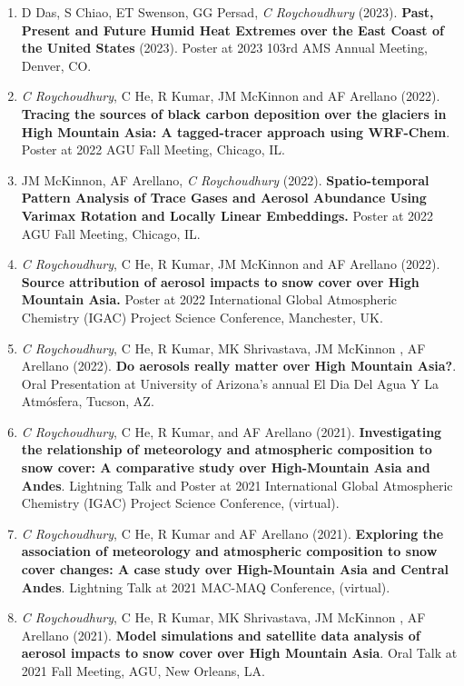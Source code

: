 \documentclass[margin,line]{resume}
\begin{document}
\begin{resume}
\begin{enumerate}[topsep=1pt, partopsep=1pt, itemsep=0.5pt, parsep=0.1pt, leftmargin=15pt,label=\arabic*.]
			\item D Das, S Chiao, ET Swenson, GG Persad, \textit{C Roychoudhury} (2023). \textbf{Past, Present and Future Humid Heat Extremes over the East Coast of the United States} (2023). Poster at 2023 103rd AMS Annual Meeting, Denver, CO. 
			
			\item \textit{C Roychoudhury}, C He, R Kumar, JM McKinnon and AF Arellano (2022).
			\textbf{Tracing the sources of black carbon deposition over the glaciers in High Mountain Asia: A tagged-tracer approach using WRF-Chem}. Poster at 2022 AGU Fall Meeting, Chicago, IL.
			
			\item JM McKinnon, AF Arellano, \textit{C Roychoudhury} (2022). \textbf{Spatio-temporal Pattern Analysis of Trace Gases and Aerosol Abundance Using Varimax Rotation and Locally Linear Embeddings.} Poster at 2022 AGU Fall Meeting, Chicago, IL.
			
			\item \textit{C Roychoudhury}, C He, R Kumar, JM McKinnon and AF Arellano (2022). 
			\textbf{Source attribution of aerosol impacts to snow cover over High Mountain Asia.} Poster at 2022 International Global Atmospheric Chemistry (IGAC) Project Science Conference, Manchester, UK.
			
			\item \textit{C Roychoudhury}, C He, R Kumar, MK Shrivastava, JM McKinnon , AF Arellano (2022).
			\textbf{Do aerosols really matter over High Mountain Asia?}.
			Oral Presentation at University of Arizona's annual El Dia Del Agua Y La Atmósfera, Tucson, AZ.
			
			\item \textit{C Roychoudhury}, C He, R Kumar, and AF Arellano (2021).
			\textbf{Investigating the relationship of meteorology and atmospheric composition to snow cover: A comparative study over High-Mountain Asia and Andes}.
			Lightning Talk and Poster at 2021 International Global Atmospheric Chemistry (IGAC) Project Science Conference, (virtual).
			
			\item \textit{C Roychoudhury}, C He, R Kumar and AF Arellano (2021).
		\textbf{Exploring the association of meteorology and atmospheric composition to snow cover changes: A case study over High-Mountain Asia and Central Andes}. 
	Lightning Talk at 2021 MAC-MAQ Conference, (virtual).
			
			\item \textit{C Roychoudhury}, C He, R Kumar, MK Shrivastava, JM McKinnon , AF Arellano (2021). 
			\textbf{Model simulations and satellite data analysis of aerosol impacts to snow cover over High Mountain Asia}. 
			Oral Talk at 2021 Fall Meeting, AGU, New Orleans, LA.
			

\end{enumerate}
\end{resume}
\end{document}

